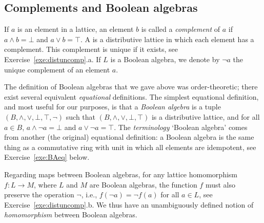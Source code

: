 \subsection*{Complements and Boolean algebras}
If $a$ is an element in a lattice, an element $b$ is called a \emph{complement} of $a$ if $a \wedge b = \bot$ and $a \vee b = \top$. A  is a distributive lattice in which each element has a complement. This complement is unique if it exists, see Exercise~\ref{exe:distuncomp}.a. If $L$ is a Boolean algebra, we denote by $\neg a$ the unique complement of an element $a$. 

The definition of Boolean algebras that we gave above was order-theoretic; there exist several equivalent \emph{equational} definitions. The simplest equational definition, and most useful for our purposes, is that a \emph{Boolean algebra} is a tuple $(B,\wedge,\vee,\bot,\top,\neg)$ such that $(B,\wedge,\vee,\bot,\top)$ is a distributive lattice, and for all $a \in B$, $a \wedge \neg a = \bot$ and $a \vee \neg a = \top$. The \emph{terminology} `Boolean algebra' comes from another (the original) equational definition: a Boolean algebra is the same thing as a commutative ring with unit in which all elements are idempotent, see Exercise~\ref{exe:BAeq} below.

Regarding maps between Boolean algebras, for any lattice homomorphism $f \colon L \to M$, where $L$ and $M$ are Boolean algebras, the function $f$ must also preserve the operation $\neg$, i.e., $f(\neg a) = \neg f(a)$ for all $a \in L$, see Exercise~\ref{exe:distuncomp}.b. We thus have an unambiguously defined notion of \emph{homomorphism} between Boolean algebras.

